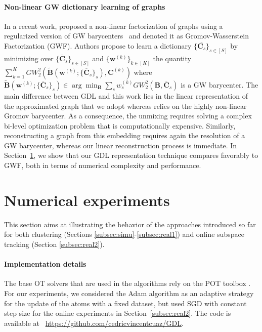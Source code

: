 \documentclass{article}
\def\vw{{\bm{w}}}
\def\mB{{\bm{B}}}
\def\mC{{\bm{C}}}
\begin{document}
	\paragraph{Non-linear GW dictionary learning of graphs} 
	In a recent work,
	\citep{xu_gromov-wasserstein_2019} proposed a non-linear factorization of
	graphs using a regularized version of GW barycenters~\citep{peyre2016gromov} and
	denoted it as Gromov-Wasserstein Factorization (GWF). Authors propose to learn a dictionary $\{\overline{\mC_s}\}_{s\in[S]}$ by 
	minimizing over $\{\overline{\mC}_s\}_{s\in[S]}$ and $\{\vw^{(k)}\}_{k\in[K]}$ the
	quantity $\sum_{k=1}^{K} GW_2^{2}(\widetilde{\mB}(\vw^{(k)};
	\{\overline{\mC}_s\}_s),\mC^{(k)})$ where $\widetilde{\mB}(\vw^{(k)};\{\overline{\mC}_s\}_s ) \in \arg\min_{\mB} \sum_{s}
	w^{(k)}_s GW_2^{2}(\mB,\overline{\mC}_s)$ is a GW barycenter. The main difference between GDL and this
	work lies in the linear representation of the approximated graph that we adopt whereas
	\citep{xu_gromov-wasserstein_2019} relies on the highly non-linear Gromov
	barycenter. As a consequence, the unmixing requires solving a complex
	bi-level optimization problem that is computationally expensive. Similarly,
	reconstructing a graph from this embedding requires again the resolution of a
	GW barycenter, whereas our linear reconstruction process is immediate. 
	In Section~\ref{sec:exp}, we show that our GDL
	representation technique compares favorably to GWF, both in terms of numerical complexity and
	performance.
	
	\section{Numerical experiments}\label{sec:exp}
	This section aims at illustrating the behavior of the approaches introduced so far for both clustering (Sections \ref{subsec:simu}-\ref{subsec:real1})  and online subspace tracking (Section \ref{subsec:real2}).
	
	
	\paragraph{Implementation details} The base OT solvers that are used in the
	algorithms rely on the POT toolbox \citep{flamary2017pot}.
	For our experiments, we considered the Adam algorithm \citep{kingma2014adam} as
	an adaptive strategy for the update of the atoms with a fixed dataset, but used
	SGD with constant step size for the online experiments in Section~\ref{subsec:real2}. The code is available at ~\href{https://github.com/cedricvincentcuaz/GDL}{https://github.com/cedricvincentcuaz/GDL}.
	
\end{document}
